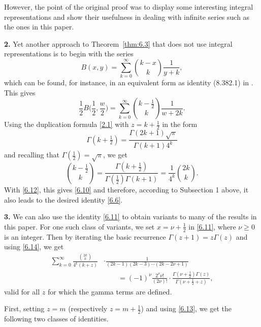 \documentclass{amsart}
\theoremstyle{definition}
\theoremstyle{remark}
\numberwithin{equation}{section}
\begin{document}
However, the point of the original proof was to display some interesting
integral representations and show their usefulness in dealing with infinite 
series such as the ones in this paper.

\medskip
{\bf 2.} Yet another approach to Theorem~\ref{thm:6.3} that does not use 
integral representations is to begin with the series
\begin{equation}\label{6.11}
B(x,y)=\sum_{k=0}^\infty\binom{k-x}{k}\frac{1}{y+k},
\end{equation}
which can be found, for instance, in an equivalent form as identity (8.382.1)
in \cite[p.~909]{GR}. This gives
\begin{equation}\label{6.12}
\frac{1}{2}B\big(\frac{1}{2},\frac{w}{2}\big)
=\sum_{k=0}^\infty\binom{k-\frac{1}{2}}{k}\frac{1}{w+2k}.
\end{equation}
Using the duplication formula \eqref{2.1} with $z=k+\frac{1}{2}$ in the form
\begin{equation}\label{6.13}
\Gamma(k+\tfrac{1}{2})=\frac{\Gamma(2k+1)\sqrt{\pi}}{\Gamma(k+1)4^k}
\end{equation}
and recalling that $\Gamma(\frac{1}{2})=\sqrt{\pi}$, we get
\begin{equation}\label{6.14}
\binom{k-\frac{1}{2}}{k}
=\frac{\Gamma(k+\frac{1}{2})}{\Gamma(\frac{1}{2})\Gamma(k+1)}
=\frac{1}{4^k}\binom{2k}{k}.
\end{equation}
With \eqref{6.12}, this gives \eqref{6.10} and therefore, according to 
Subsection 1 above, it also leads to the desired identity \eqref{6.6}.

\medskip
{\bf 3.} We can also use the identity \eqref{6.11} to obtain variants to many
of the results in this paper. For one such class of variants, we set 
$x=\nu+\frac{1}{2}$ in \eqref{6.11}, where $\nu\geq 0$ is an integer. Then by
iterating the basic recurrence $\Gamma(z+1)=z\Gamma(z)$ and using \eqref{6.14},
we get
\begin{align}
\sum_{k=0}^\infty\frac{\binom{2k}{k}}{4^k(k+z)}
&\cdot\frac{1}{(2k-1)(2k-3)\cdots(2k-2\nu+1)} \label{6.15} \\
&\qquad =(-1)^\nu\frac{2^\nu\nu!}{(2\nu)!}
\cdot\frac{\Gamma(\nu+\frac{1}{2})\Gamma(z)}{\Gamma(\nu+\frac{1}{2}+z)},\nonumber
\end{align}
valid for all $z$ for which the gamma terms are defined. 

First, setting $z=m$ (respectively $z=m+\frac{1}{2}$) and using \eqref{6.13},
we get the following two classes of identities.
\end{document}
